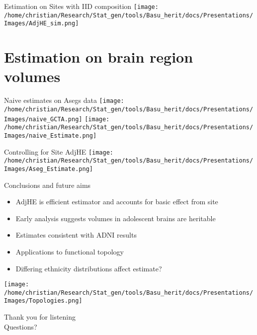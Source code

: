 \documentclass[
  ignorenonframetext,
]{beamer}
\begin{document}
\begin{frame}{Estimation on Sites with IID composition}
\centering
\texttt{[image: /home/christian/Research/Stat\_gen/tools/Basu\_herit/docs/Presentations/Images/AdjHE\_sim.png]}
\end{frame}

\section{Estimation on brain region volumes}
\begin{frame}{Naive estimates on Asegs data}
\texttt{[image: /home/christian/Research/Stat\_gen/tools/Basu\_herit/docs/Presentations/Images/naive\_GCTA.png]}
\texttt{[image: /home/christian/Research/Stat\_gen/tools/Basu\_herit/docs/Presentations/Images/naive\_Estimate.png]}


\end{frame}


\begin{frame}{Controlling for Site AdjHE}
\texttt{[image: /home/christian/Research/Stat\_gen/tools/Basu\_herit/docs/Presentations/Images/Aseg\_Estimate.png]}

\end{frame}






\begin{frame}{Conclusions and future aims}
\begin{itemize}
	\item AdjHE is efficient estimator and accounts for basic effect from site
	\item Early analysis suggests volumes in adolescent brains are heritable
	\item Estimates consistent with ADNI results
	\item Applications to functional topology
	\item Differing ethnicity distributions affect estimate?
\end{itemize}
\centering
\texttt{[image: /home/christian/Research/Stat\_gen/tools/Basu\_herit/docs/Presentations/Images/Topologies.png]}

\end{frame}


\begin{frame}
\begin{Huge}
Thank you for listening \\
Questions?
\end{Huge}
\end{frame}
\end{document}
